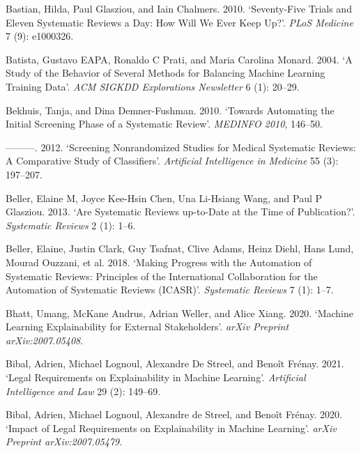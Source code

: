 \documentclass{article}
\newlength{\cslhangindent}
\newlength{\cslentryspacingunit} %
\newenvironment{CSLReferences}[2] %
 {%
  \setlength{\parindent}{0pt}
  \ifodd #1
  \let\oldpar\par
  \def\par{\hangindent=\cslhangindent\oldpar}
  \fi
  \setlength{\parskip}{#2\cslentryspacingunit}
 }%
 {}
\begin{document}
\begin{CSLReferences}{1}{0}
\leavevmode{}%
Bastian, Hilda, Paul Glasziou, and Iain Chalmers. 2010. {`Seventy-Five
Trials and Eleven Systematic Reviews a Day: How Will We Ever Keep Up?'}.
\emph{PLoS Medicine} 7 (9): e1000326.

\leavevmode{}%
Batista, Gustavo EAPA, Ronaldo C Prati, and Maria Carolina Monard. 2004.
{`A Study of the Behavior of Several Methods for Balancing Machine
Learning Training Data'}. \emph{ACM SIGKDD Explorations Newsletter} 6
(1): 20--29.

\leavevmode{}%
Bekhuis, Tanja, and Dina Demner-Fushman. 2010. {`Towards Automating the
Initial Screening Phase of a Systematic Review'}. \emph{MEDINFO 2010},
146--50.

\leavevmode{}%
---------. 2012. {`Screening Nonrandomized Studies for Medical
Systematic Reviews: A Comparative Study of Classifiers'}.
\emph{Artificial Intelligence in Medicine} 55 (3): 197--207.

\leavevmode{}%
Beller, Elaine M, Joyce Kee-Hsin Chen, Una Li-Hsiang Wang, and Paul P
Glasziou. 2013. {`Are Systematic Reviews up-to-Date at the Time of
Publication?'}. \emph{Systematic Reviews} 2 (1): 1--6.

\leavevmode{}%
Beller, Elaine, Justin Clark, Guy Tsafnat, Clive Adams, Heinz Diehl,
Hans Lund, Mourad Ouzzani, et al. 2018. {`Making Progress with the
Automation of Systematic Reviews: Principles of the International
Collaboration for the Automation of Systematic Reviews (ICASR)'}.
\emph{Systematic Reviews} 7 (1): 1--7.

\leavevmode{}%
Bhatt, Umang, McKane Andrus, Adrian Weller, and Alice Xiang. 2020.
{`Machine Learning Explainability for External Stakeholders'}.
\emph{arXiv Preprint arXiv:2007.05408}.

\leavevmode{}%
Bibal, Adrien, Michael Lognoul, Alexandre De Streel, and Benoît Frénay.
2021. {`Legal Requirements on Explainability in Machine Learning'}.
\emph{Artificial Intelligence and Law} 29 (2): 149--69.

\leavevmode{}%
Bibal, Adrien, Michael Lognoul, Alexandre de Streel, and Benoît Frénay.
2020. {`Impact of Legal Requirements on Explainability in Machine
Learning'}. \emph{arXiv Preprint arXiv:2007.05479}.


\end{CSLReferences}
\end{document}
